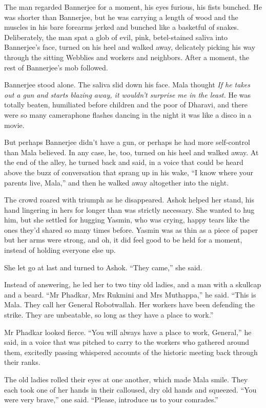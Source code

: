 The man regarded Bannerjee for a moment, his eyes furious, his
fists bunched. He was shorter than Bannerjee, but he was carrying a
length of wood and the muscles in his bare forearms jerked and
bunched like a basketful of snakes. Deliberately, the man spat a
glob of evil, pink, betel-stained saliva into Bannerjee's face,
turned on his heel and walked away, delicately picking his way
through the sitting Webblies and workers and neighbors. After a
moment, the rest of Bannerjee's mob followed.

Bannerjee stood alone. The saliva slid down his face. Mala thought
\emph{If he takes out a gun and starts blazing away, it wouldn't surprise me in the least.}
He was totally beaten, humiliated before children and the poor of
Dharavi, and there were so many cameraphone flashes dancing in the
night it was like a disco in a movie.

But perhaps Bannerjee didn't have a gun, or perhaps he had more
self-control than Mala believed. In any case, he, too, turned on
his heel and walked away. At the end of the alley, he turned back
and said, in a voice that could be heard above the buzz of
conversation that sprang up in his wake, ``I know where your parents
live, Mala,'' and then he walked away altogether into the night.

The crowd roared with triumph as he disappeared. Ashok helped her
stand, his hand lingering in hers for longer than was strictly
necessary. She wanted to hug him, but she settled for hugging
Yasmin, who was crying, happy tears like the ones they'd shared so
many times before. Yasmin was as thin as a piece of paper but her
arms were strong, and oh, it did feel good to be held for a moment,
instead of holding everyone else up.

She let go at last and turned to Ashok. ``They came,'' she said.

Instead of answering, he led her to two tiny old ladies, and a man
with a skullcap and a beard. ``Mr Phadkar, Mrs Rukmini and Mrs
Muthappa,'' he said. ``This is Mala. They call her General
Robotwallah. Her workers have been defending the strike. They are
unbeatable, so long as they have a place to work.''

Mr Phadkar looked fierce. ``You will always have a place to work,
General,'' he said, in a voice that was pitched to carry to the
workers who gathered around them, excitedly passing whispered
accounts of the historic meeting back through their ranks.

The old ladies rolled their eyes at one another, which made Mala
smile. They each took one of her hands in their calloused, dry old
hands and squeezed. ``You were very brave,'' one said. ``Please,
introduce us to your comrades.''

